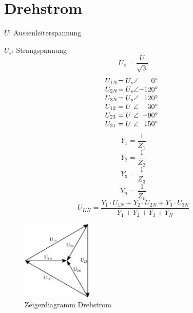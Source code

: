 



\chapter{Drehstrom}
\newpage
%
%
$U$: Aussenleiterspannung

$U_s$: Strangspannung
\[ U_s = \frac{U}{\sqrt{3}} \]
\[ \begin{array}{@{}l@{}l@{}l@{}r}
U_{1N} &= U_s &\angle &   0^\circ \\
U_{2N} &= U_s &\angle &-120^\circ \\
U_{3N} &= U_s &\angle & 120^\circ \\
U_{12} &= U   &\angle &  30^\circ \\
U_{23} &= U   &\angle & -90^\circ \\
U_{31} &= U   &\angle & 150^\circ 
\end{array} \]
\[ Y_1 = \frac{1}{Z_1} \]
\[ Y_2 = \frac{1}{Z_2} \]
\[ Y_3 = \frac{1}{Z_3} \]
\[ Y_n = \frac{1}{Z_n} \]
\[ U_{KN} = \frac{Y_1 \cdot U_{1N} + Y_2 \cdot U_{2N} + Y_3 \cdot U_{3N}}
{Y_1 + Y_2 + Y_3 + Y_N} \]
\begin{figure}[h!]
  \centering
  \includegraphics[width=0.3\textwidth]{drehstrom.pdf}
  \caption{Zeigerdiagramm Drehstrom}
  \label{fig:zeig_dreh}
\end{figure}
